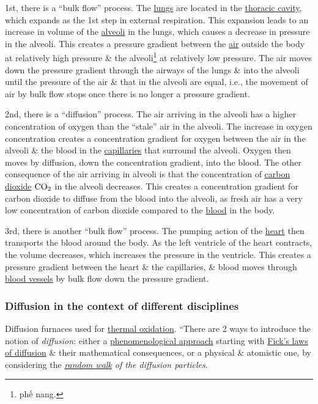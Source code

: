 \documentclass{article}
\begin{document}
1st, there is a ``bulk flow'' process. The \href{https://en.wikipedia.org/wiki/Lungs}{lungs} are located in the \href{https://en.wikipedia.org/wiki/Thoracic_cavity}{thoracic cavity}, which expands as the 1st step in external respiration. This expansion leads to an increase in volume of the \href{https://en.wikipedia.org/wiki/Pulmonary_alveolus}{alveoli} in the lungs, which causes a decrease in pressure in the alveoli. This creates a pressure gradient between the \href{https://en.wikipedia.org/wiki/Air}{air} outside the body at relatively high pressure \& the alveoli\footnote{phế nang.} at relatively low pressure. The air moves down the pressure gradient through the airways of the lungs \& into the alveoli until the pressure of the air \& that in the alveoli are equal, i.e., the movement of air by bulk flow stops once there is no longer a pressure gradient.

2nd, there is a ``diffusion'' process. The air arriving in the alveoli has a higher concentration of oxygen than the ``stale'' air in the alveoli. The increase in oxygen concentration creates a concentration gradient for oxygen between the air in the alveoli \& the blood in the \href{https://en.wikipedia.org/wiki/Capillaries}{capillaries} that surround the alveoli. Oxygen then moves by diffusion, down the concentration gradient, into the blood. The other consequence of the air arriving in alveoli is that the concentration of \href{https://en.wikipedia.org/wiki/Carbon_dioxide}{carbon dioxide} $\rm CO_2$ in the alveoli decreases. This creates a concentration gradient for carbon dioxide to diffuse from the blood into the alveoli, as fresh air has a very low concentration of carbon dioxide compared to the \href{https://en.wikipedia.org/wiki/Blood}{blood} in the body.

3rd, there is another ``bulk flow'' process. The pumping action of the \href{https://en.wikipedia.org/wiki/Heart}{heart} then transports the blood around the body. As the left ventricle of the heart contracts, the volume decreases, which increases the pressure in the ventricle. This creates a pressure gradient between the heart \& the capillaries, \& blood moves through \href{https://en.wikipedia.org/wiki/Blood_vessel}{blood vessels} by bulk flow down the pressure gradient.

\subsubsection{Diffusion in the context of different disciplines}
{\sf Diffusion furnaces used for \href{https://en.wikipedia.org/wiki/Thermal_oxidation}{thermal oxidation}}. ``There are 2 ways to introduce the notion of {\it diffusion}: either a \href{https://en.wiktionary.org/wiki/phenomenon}{phenomenological approach} starting with \href{https://en.wikipedia.org/wiki/Fick%27s_laws_of_diffusion}{Fick's laws of diffusion} \& their mathematical consequences, or a physical \& atomistic one, by considering the {\it\href{https://en.wikipedia.org/wiki/Random_walk}{random walk} of the diffusion particles}.
\end{document}
